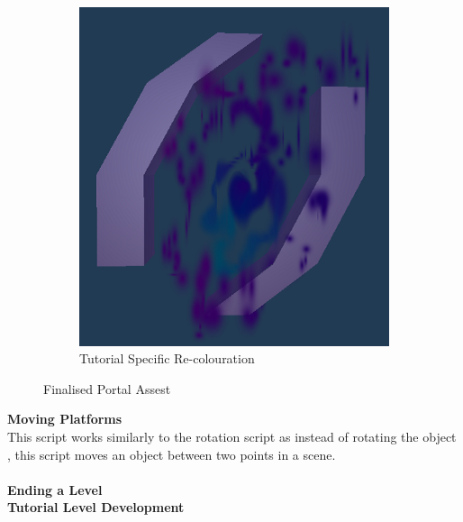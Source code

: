 \begin{figure}[H]
\begin{subfigure}{0.4\textwidth}
  \includegraphics[width=1\linewidth]{Figures/finportb.png}
  \caption{Tutorial Specific Re-colouration}
\end{subfigure}
\caption{Finalised Portal Assest}
\label{portals}
\end{figure}

\noindent \textbf{Moving Platforms}\\
This script works similarly to the rotation script as instead of rotating the object , this script moves an object between two points in a scene. 
\\\\
\textbf{Ending a Level}\\


\textbf{Tutorial Level Development}\\



